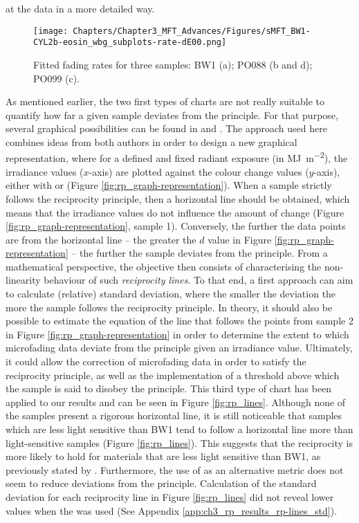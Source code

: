 at the data in a more detailed way. \\


\begin{figure*}[!h]
\centering
\texttt{[image: Chapters/Chapter3\_MFT\_Advances/Figures/sMFT\_BW1-CYL2b-eosin\_wbg\_subplots-rate-dE00.png]}
\caption[\hspace{0.3cm}Fitted fading rates]{Fitted fading rates for three samples: BW1 (a); PO088 (b and d); PO099 (c).}
\label{fig:rp_fading-rates}
\end{figure*}


As mentioned earlier, the two first types of charts are not really suitable to quantify how far a given sample deviates from the principle. For that purpose, several graphical possibilities can be found in \citet[Figures 2 and 3]{martin_reciprocity_2003} and \citet[Figure 6]{del_hoyo-melendez_investigation_2011}. The approach used here combines ideas from both authors in order to design a new graphical representation, where for a defined and fixed radiant exposure (in \unit{\mega\joule\per\square\metre}), the irradiance values ($x$-axis) are plotted against the colour change values ($y$-axis), either with \dEOO or \dRvis (Figure \ref{fig:rp_graph-representation}). When a sample strictly follows the reciprocity principle, then a horizontal line should be obtained, which means that the irradiance values do not influence the amount of change (Figure \ref{fig:rp_graph-representation}, sample 1). Conversely, the further the data points are from the horizontal line – \ie the greater the $d$ value in Figure \ref{fig:rp_graph-representation} – the further the sample deviates from the principle. From a mathematical perspective, the objective then consists of characterising the non-linearity behaviour of such \textit{reciprocity lines}. To that end, a first approach can aim to calculate (relative) standard deviation, where the smaller the deviation the more the sample follows the reciprocity principle. In theory, it should also be possible to estimate the equation of the line that follows the points from sample 2 in Figure \ref{fig:rp_graph-representation} in order to determine the extent to which microfading data deviate from the principle given an irradiance value. Ultimately, it could allow the correction of microfading data in order to satisfy the reciprocity principle, as well as the implementation of a threshold above which the sample is said to disobey the principle. This third type of chart has been applied to our results and can be seen in Figure \ref{fig:rp_lines}. Although none of the samples present a rigorous horizontal line, it is still noticeable that samples which are less light sensitive than BW1 tend to follow a horizontal line more than light-sensitive samples (Figure \ref{fig:rp_lines}). This suggests that the reciprocity is more likely to hold for materials that are less light sensitive than BW1, as previously stated by \citet[61]{del_hoyo-melendez_investigation_2011}. Furthermore, the use of \dRvis as an alternative metric does not seem to reduce deviations from the principle. Calculation of the standard deviation for each reciprocity line in Figure \ref{fig:rp_lines} did not reveal lower values when the \dRvis was used (See Appendix \ref{app:ch3_rp_results_rp-lines_std}).

